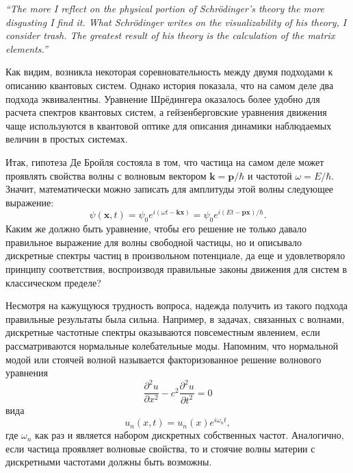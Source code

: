 \documentclass[14pt, a4paper]{extreport}
\numberwithin{equation}{section}
\begin{document}
\begin{center}
\begin{minipage}{0.9\textwidth}
\textit{``The more I reflect on the physical portion of Schrödinger's theory the more disgusting I find it. What Schrödinger writes on the visualizability of his theory, I consider trash. The greatest result of his theory is the calculation of the matrix elements.''}
\end{minipage}
\end{center}
Как видим, возникла некоторая соревновательность между двумя подходами к описанию квантовых систем. Однако история показала, что на самом деле два подхода эквивалентны. Уравнение Шрёдингера оказалось более удобно для расчета спектров квантовых систем, а гейзенберговские уравнения движения чаще используются в квантовой оптике для описания динамики наблюдаемых величин в простых системах.

Итак, гипотеза Де Бройля состояла в том, что частица на самом деле может проявлять свойства волны с волновым вектором $\mathbf{k} = \mathbf{p}/\hbar$ и частотой $\omega = E/\hbar$. Значит, математически можно записать для амплитуды этой волны следующее выражение:
\begin{equation}
	\psi (\mathbf{x},t) = \psi_0 e^{i(\omega t - \mathbf{k} \mathbf{x})} = \psi_0 e^{i(E t - \mathbf{p} \mathbf{x})/\hbar}. \label{eq:psi}
\end{equation}
Каким же должно быть уравнение, чтобы его решение не только давало правильное выражение для волны свободной частицы, но и описывало дискретные спектры частиц в произвольном потенциале, да еще и удовлетворяло принципу соответствия, воспроизводя правильные законы движения для систем в классическом пределе?

Несмотря на кажущуюся трудность вопроса, надежда получить из такого подхода правильные результаты была сильна. Например, в задачах, связанных с волнами, дискретные частотные спектры оказываются повсеместным явлением, если рассматриваются нормальные колебательные моды. Напомним, что нормальной модой или стоячей волной называется факторизованное решение волнового уравнения
\begin{equation}
	\frac{\partial^2 u}{\partial x^2} - c^2 \frac{\partial^2 u}{\partial t^2} = 0\label{eq:wave_eq}
\end{equation}
вида
\begin{equation}
	u_n(x, t) = u_n(x) e^{i\omega_n t},
\end{equation}
где ${\omega_n}$ как раз и является набором дискретных собственных частот. Аналогично, если частица проявляет волновые свойства, то и стоячие волны материи с дискретными частотами должны быть возможны.
\end{document}
